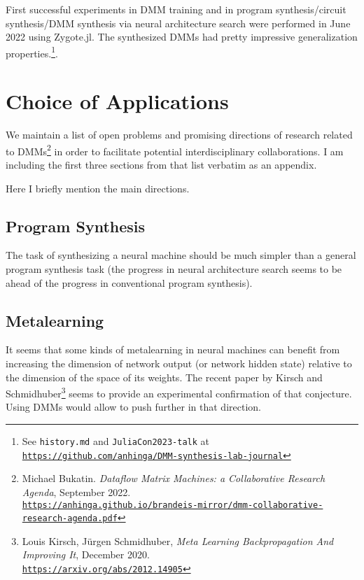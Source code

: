 \documentclass{article}
\begin{document}
First successful experiments in DMM training and in program synthesis/circuit synthesis/DMM synthesis via neural architecture search
were performed in June 2022 using Zygote.jl. The synthesized DMMs had pretty impressive generalization properties.\footnote{See {\tt history.md} and {\tt JuliaCon2023-talk} at
\href{https://github.com/anhinga/DMM-synthesis-lab-journal}{\tt https://github.com/anhinga/DMM-synthesis-lab-journal}}.

\section{Choice of Applications}

We maintain a list of open problems and promising directions of research related to 
DMMs\footnote{Michael Bukatin. {\em Dataflow Matrix Machines:  a Collaborative Research Agenda}, September 2022.\\
\href{https://anhinga.github.io/brandeis-mirror/dmm-collaborative-research-agenda.pdf}
{\tt https://anhinga.github.io/brandeis-mirror/dmm-collaborative-research-agenda.pdf}} in order to facilitate potential
interdisciplinary collaborations. I am including the first three
sections from that list verbatim as an appendix. 

Here I briefly mention the main directions.

\subsection{Program Synthesis}

The task of synthesizing a neural machine should be much simpler than a general program synthesis task
(the progress in neural architecture search seems to be ahead of the progress in conventional program synthesis).

\subsection{Metalearning}

It seems that some kinds of metalearning in neural machines can benefit from increasing the dimension of
network output (or network hidden state) relative to the dimension of the space of its weights. The recent
paper by Kirsch and Schmidhuber\footnote{Louis Kirsch, Jürgen Schmidhuber,
{\em Meta Learning Backpropagation And Improving It}, December 2020.\\
\href{https://arxiv.org/abs/2012.14905}{\tt https://arxiv.org/abs/2012.14905}} seems to provide
an experimental confirmation of that conjecture. Using DMMs would allow to push further in that direction. 
\end{document}

